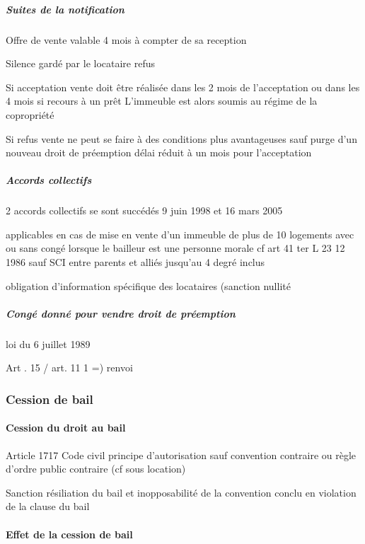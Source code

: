 \documentclass[10pt,a4paper,twoside]{article}
\begin{document}
				\subparagraph{Suites de la notification}

					Offre de vente valable 4 mois à compter de sa reception

					Silence gardé par le locataire refus

					Si acceptation vente doit être réalisée dans les 2 mois de
					l’acceptation ou dans les 4 mois si recours à un prêt L’immeuble
					est alors soumis au régime de la copropriété

					Si refus vente ne peut se faire à des conditions plus avantageuses
					sauf purge d’un nouveau droit de préemption délai réduit à un
					mois pour l’acceptation

				\subparagraph{Accords collectifs}

					2 accords collectifs se sont succédés 9 juin 1998 et 16
					mars 2005

					applicables en cas de mise en vente d’un immeuble de
					plus de 10 logements avec ou sans congé lorsque le
					bailleur est une personne morale cf art 41 ter L
					23 12 1986 sauf SCI entre parents et alliés jusqu’au 4
					degré inclus

					obligation d’information spécifique des locataires
					(sanction nullité

				\subparagraph{Congé donné pour vendre droit de préemption}

					loi du 6 juillet 1989

					Art . 15 / art. 11 1
					=) renvoi

		\subsubsection{Cession de bail}

			\paragraph{Cession du droit au bail}

				Article 1717 Code civil principe d’autorisation sauf
				convention contraire ou règle d’ordre public contraire (cf
				sous location)

				Sanction résiliation du bail et inopposabilité de la
				convention conclu en violation de la clause du bail

			\paragraph{Effet de la cession de bail}
\end{document}
